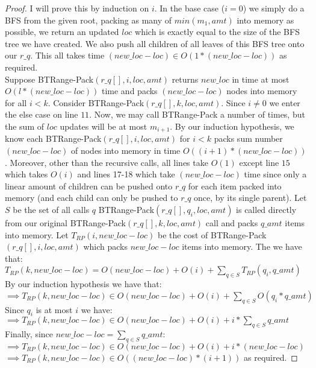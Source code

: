 \documentclass[letterpaper,12pt,titlepage,oneside,final]{book}
\theoremstyle{plain}
\begin{document}
\begin{proof}
I will prove this by induction on $i$. In the base case ($i=0$) we simply do a BFS from the given root, packing as many of $min(m_1, amt)$ into memory as possible, we return an updated $loc$ which is exactly equal to the size of the BFS tree we have created. We also push all children of all leaves of this BFS tree onto our $r\_q$. This all takes time $(new\_loc - loc) \in O(1*(new\_loc - loc))$ as required. \\

Suppose BT\textendash Range-Pack$(r\_q[], i, loc, amt)$ returns $new\_loc$ in time at most $O(l*(new\_loc - loc))$ time and packs $(new\_loc - loc)$ nodes into memory for all $i < k$. Consider BT\textendash Range-Pack$(r\_q[], k, loc, amt)$. Since $i \neq 0$ we enter the else case on line $11$. Now, we may call BT\textendash Range-Pack a number of times, but the sum of $loc$ updates will be at most $m_{i+1}$. By our induction hypothesis, we know each BT\textendash Range-Pack$(r\_q[], i, loc, amt)$ for $i < k$ packs sum number $(new\_loc - loc)$ of nodes into memory in time $O((i+1)*(new\_loc - loc))$. Moreover, other than the recursive calls, all lines take $O(1)$ except line $15$ which takes $O(i)$ and lines 17-18 which take $(new\_loc - loc)$ time since only a linear amount of children can be pushed onto $r\_q$ for each item packed into memory (and each child can only be pushed to $r\_q$ once, by its single parent). Let $S$ be the set of all calls $q$ BT\textendash Range-Pack$(r\_q[], q_i, loc, amt)$ is called directly from our original BT\textendash Range-Pack$(r\_q[], k, loc, amt)$ call and packs $q\_amt$ items into memory. Let $T_{RP}(i, new\_loc - loc)$ be the cost of BT\textendash Range-Pack$(r\_q[], i, loc, amt)$ which packs $new\_loc - loc$ items into memory. The we have that: \\

$T_{RP}(k, new\_loc - loc) = O(new\_loc - loc) + O(i) + \sum_{q \in S} T_{RP}(q_i, q\_amt)$ \\ 
By our induction hypothesis we have that: \\
$\implies T_{RP}(k, new\_loc - loc) \in O(new\_loc - loc) + O(i) + \sum_{q \in S} O(q_i*q\_amt)$ \\
Since $q_i$ is at most $i$ we have: \\
$\implies T_{RP}(k, new\_loc - loc) \in O(new\_loc - loc) + O(i) + i* \sum_{q \in S} q\_amt$ \\
Finally, since $new\_loc - loc = \sum_{q \in S} q\_amt$: \\
$\implies T_{RP}(k, new\_loc - loc) \in O(new\_loc - loc) + O(i) + i*(new\_loc - loc)$ \\
$\implies T_{RP}(k, new\_loc - loc) \in O((new\_loc - loc)*(i+1))$ as required.
\end{proof}
\end{document}
